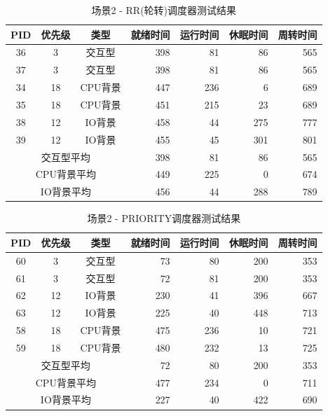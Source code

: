 \documentclass[a4paper, 12pt]{article}
\begin{document}
\begin{table}[H]
	\centering
	\caption{场景2 - RR(轮转)调度器测试结果}
	\begin{tabular}{cccrrrr}
		\toprule
		\textbf{PID} & \textbf{优先级} & \textbf{类型} & \textbf{就绪时间} & \textbf{运行时间} & \textbf{休眠时间} & \textbf{周转时间} \\
		\midrule
		36 & 3 & 交互型 & 398 & 81 & 86 & 565 \\
		37 & 3 & 交互型 & 398 & 81 & 86 & 565 \\
		34 & 18 & CPU背景 & 447 & 236 & 6 & 689 \\
		35 & 18 & CPU背景 & 451 & 215 & 23 & 689 \\
		38 & 12 & IO背景 & 458 & 44 & 275 & 777 \\
		39 & 12 & IO背景 & 455 & 45 & 301 & 801 \\
		\midrule
		\multicolumn{3}{c}{交互型平均} & 398 & 81 & 86 & 565 \\
		\multicolumn{3}{c}{CPU背景平均} & 449 & 225 & 0 & 674 \\
		\multicolumn{3}{c}{IO背景平均} & 456 & 44 & 288 & 789 \\
		\bottomrule
	\end{tabular}
\end{table}

\begin{table}[H]
	\centering
	\caption{场景2 - PRIORITY调度器测试结果}
	\begin{tabular}{cccrrrr}
		\toprule
		\textbf{PID} & \textbf{优先级} & \textbf{类型} & \textbf{就绪时间} & \textbf{运行时间} & \textbf{休眠时间} & \textbf{周转时间} \\
		\midrule
		60 & 3 & 交互型 & 73 & 80 & 200 & 353 \\
		61 & 3 & 交互型 & 72 & 81 & 200 & 353 \\
		62 & 12 & IO背景 & 230 & 41 & 396 & 667 \\
		63 & 12 & IO背景 & 225 & 40 & 448 & 713 \\
		58 & 18 & CPU背景 & 475 & 236 & 10 & 721 \\
		59 & 18 & CPU背景 & 480 & 232 & 13 & 725 \\
		\midrule
		\multicolumn{3}{c}{交互型平均} & 72 & 80 & 200 & 353 \\
		\multicolumn{3}{c}{CPU背景平均} & 477 & 234 & 0 & 711 \\
		\multicolumn{3}{c}{IO背景平均} & 227 & 40 & 422 & 690 \\
		\bottomrule
	\end{tabular}
\end{table}
\end{document}
